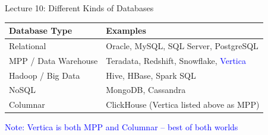 \documentclass{beamer}
\begin{document}
\begin{frame}{Lecture 10: Different Kinds of Databases}
	\begin{table}
		\small
		\begin{tabular}{|l|l|}
			\hline
			\textbf{Database Type} & \textbf{Examples} \\
			\hline
			Relational & Oracle, MySQL, SQL Server, PostgreSQL \\
			\hline
			MPP / Data Warehouse & Teradata, Redshift, Snowflake, \textcolor{blue}{Vertica} \\
			\hline
			Hadoop / Big Data & Hive, HBase, Spark SQL \\
			\hline
			NoSQL & MongoDB, Cassandra \\
			\hline
			Columnar & ClickHouse (Vertica listed above as MPP) \\
			\hline
		\end{tabular}
	\end{table}
	
	\vspace{0.3cm}
	\begin{center}
		\textcolor{blue}{\tiny Note: Vertica is both MPP and Columnar – best of both worlds}
	\end{center}
\end{frame}
	
	
\end{document}
